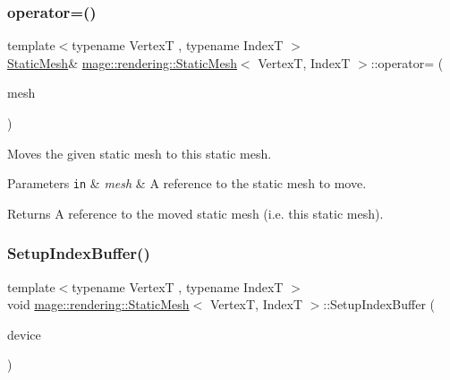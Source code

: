 \subsubsection{\texorpdfstring{operator=()}{operator=()}\hspace{0.1cm}{\footnotesize\ttfamily [2/2]}}
{\footnotesize\ttfamily template$<$typename VertexT , typename IndexT $>$ \\
\hyperlink{classmage_1_1rendering_1_1_static_mesh}{Static\+Mesh}\& \hyperlink{classmage_1_1rendering_1_1_static_mesh}{mage\+::rendering\+::\+Static\+Mesh}$<$ VertexT, IndexT $>$\+::operator= (\begin{DoxyParamCaption}\item[{\hyperlink{classmage_1_1rendering_1_1_static_mesh}{Static\+Mesh}$<$ VertexT, IndexT $>$ \&\&}]{mesh }\end{DoxyParamCaption})\hspace{0.3cm}{\ttfamily [noexcept]}}

Moves the given static mesh to this static mesh.


\begin{DoxyParams}[1]{Parameters}
\mbox{\tt in}  & {\em mesh} & A reference to the static mesh to move. \\
\hline
\end{DoxyParams}
\begin{DoxyReturn}{Returns}
A reference to the moved static mesh (i.\+e. this static mesh). 
\end{DoxyReturn}
\hypertarget{classmage_1_1rendering_1_1_static_mesh_acd815df7e87dde687613e3f4d5acc564}{}\label{classmage_1_1rendering_1_1_static_mesh_acd815df7e87dde687613e3f4d5acc564} 
\subsubsection{\texorpdfstring{Setup\+Index\+Buffer()}{SetupIndexBuffer()}}
{\footnotesize\ttfamily template$<$typename VertexT , typename IndexT $>$ \\
void \hyperlink{classmage_1_1rendering_1_1_static_mesh}{mage\+::rendering\+::\+Static\+Mesh}$<$ VertexT, IndexT $>$\+::Setup\+Index\+Buffer (\begin{DoxyParamCaption}\item[{I\+D3\+D11\+Device \&}]{device }\end{DoxyParamCaption})\hspace{0.3cm}{\ttfamily [private]}}

